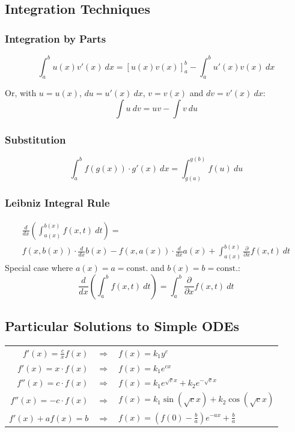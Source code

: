 \subsection{Integration Techniques}

\subsubsection{Integration by Parts}
\begin{equation*}
    \int_a^b u(x)v'(x)\ dx = \left[ u(x)v(x) \right]_a^b-\int_a^bu'(x)v(x)\ dx
\end{equation*}

Or, with $u=u(x)$, $du=u'(x)\ dx$, $v=v(x)$ and $dv=v'(x)\ dx$:
\begin{equation*}
    \int u\ dv=uv - \int v\ du
\end{equation*}

\subsubsection{Substitution}
\begin{equation*}
    \int_a^b f(g(x))\cdot g'(x)\ dx = \int_{g(a)}^{g(b)}f(u)\ du
\end{equation*}

\subsubsection{Leibniz Integral Rule}
\begin{multline*}
    \frac{d}{dx}\left(\int_{a(x)}^{b(x)}f(x,t)\ dt\right)
    =
    \\
    f(x,b(x))\cdot\frac{d}{dx}b(x)
    -f(x,a(x))\cdot\frac{d}{dx}a(x)
    +\int_{a(x)}^{b(x)}\frac{\partial}{\partial x}f(x,t)\ dt
\end{multline*}
Special case where $a(x)=a=\mathrm{const.}$ and $b(x)=b=\mathrm{const.}$:
\begin{equation*}
    \frac{d}{dx}\left(\int_a^b f(x,t)\ dt\right)
    =\int_a^b\frac{\partial}{\partial x}f(x,t)\ dt
\end{equation*}

\subsection{Particular Solutions to Simple ODEs}

\begin{tabular}[h]{rcl}
    $f'(x)=\frac{c}{x}f(x)$ & $\Rightarrow$ & $f(x)=k_1y^c$                                             \\
    $f'(x)=x\cdot f(x)$     & $\Rightarrow$ & $f(x)=k_1e^{cx}$                                          \\
    $f''(x) = c\cdot f(x)$  & $\Rightarrow$ & $f(x) = k_1e^{\sqrt{c}x}+k_2e^{-\sqrt{c}x}$               \\
    $f''(x) = -c\cdot f(x)$ & $\Rightarrow$ & $f(x)=k_1\sin(\sqrt{c}x)+k_2\cos(\sqrt{c}x)$              \\
    $f'(x)+af(x) = b$       & $\Rightarrow$ & $f(x) = \left(f(0)-\frac{b}{a}\right)e^{-ax}+\frac{b}{a}$
\end{tabular}
